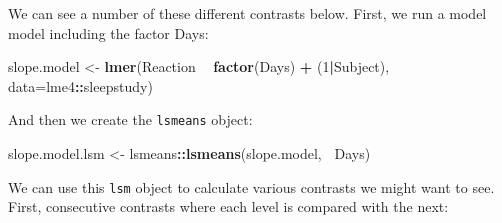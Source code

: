 \documentclass[]{article}
\newenvironment{Shaded}{\begin{snugshade}}{\end{snugshade}}
\newcommand{\DataTypeTok}[1]{\textcolor[rgb]{0.13,0.29,0.53}{#1}}
\newcommand{\DecValTok}[1]{\textcolor[rgb]{0.00,0.00,0.81}{#1}}
\newcommand{\KeywordTok}[1]{\textcolor[rgb]{0.13,0.29,0.53}{\textbf{#1}}}
\newcommand{\NormalTok}[1]{#1}
\newcommand{\OperatorTok}[1]{\textcolor[rgb]{0.81,0.36,0.00}{\textbf{#1}}}
\newcommand{\StringTok}[1]{\textcolor[rgb]{0.31,0.60,0.02}{#1}}
\begin{document}
We can see a number of these different contrasts below. First, we run a model
model including the factor Days:

\begin{Shaded}
\begin{Highlighting}[]
\NormalTok{slope.model <-}\StringTok{ }\KeywordTok{lmer}\NormalTok{(Reaction }\OperatorTok{~}\StringTok{ }\KeywordTok{factor}\NormalTok{(Days) }\OperatorTok{+}\StringTok{ }\NormalTok{(}\DecValTok{1}\OperatorTok{|}\NormalTok{Subject),}
                    \DataTypeTok{data=}\NormalTok{lme4}\OperatorTok{::}\NormalTok{sleepstudy)}
\end{Highlighting}
\end{Shaded}

And then we create the \texttt{lsmeans} object:

\begin{Shaded}
\begin{Highlighting}[]
\NormalTok{slope.model.lsm <-}\StringTok{ }\NormalTok{lsmeans}\OperatorTok{::}\KeywordTok{lsmeans}\NormalTok{(slope.model, }\OperatorTok{~}\NormalTok{Days)}
\end{Highlighting}
\end{Shaded}

We can use this \texttt{lsm} object to calculate various contrasts we might want to
see. First, consecutive contrasts where each level is compared with the next:
\end{document}

